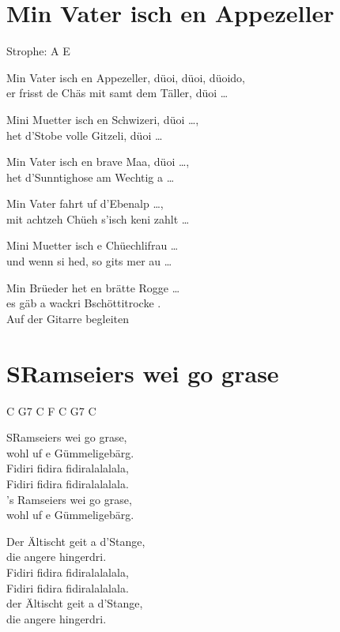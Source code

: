 \documentclass[
  letterpaper,
  twoside=false]{scrbook}
\begin{document}
\hypertarget{min-vater-isch-en-appezeller}{%
\chapter{Min Vater isch en
Appezeller}\label{min-vater-isch-en-appezeller}}

Strophe: A E

Min Vater isch en Appezeller, düoi, düoi, düoido,\\
er frisst de Chäs mit samt dem Täller, düoi \ldots{}

Mini Muetter isch en Schwizeri, düoi \ldots,\\
het d'Stobe volle Gitzeli, düoi \ldots{}

Min Vater isch en brave Maa, düoi \ldots,\\
het d'Sunntighose am Wechtig a \ldots{}

Min Vater fahrt uf d'Ebenalp \ldots,\\
mit achtzeh Chüeh s'isch keni zahlt \ldots{}

Mini Muetter isch e Chüechlifrau \ldots{}\\
und wenn si hed, so git\textquotesingle s mer au \ldots{}

Min Brüeder het en brätte Rogge \ldots{}\\
es gäb a wackri Bschöttitrocke .\\
Auf der Gitarre begleiten

\hypertarget{sramseiers-wei-go-grase}{%
\chapter{S\textquotesingle Ramseiers wei go
grase}\label{sramseiers-wei-go-grase}}

C G7 C F C G7 C

S\textquotesingle Ramseiers wei go grase,\\
wohl uf e Gümmeligebärg.\\
Fidiri fidira fidiralalalala,\\
Fidiri fidira fidiralalalala.\\
's Ramseiers wei go grase,\\
wohl uf e Gümmeligebärg.

Der Ältischt geit a d'Stange,\\
die angere hingerdri.\\
Fidiri fidira fidiralalalala,\\
Fidiri fidira fidiralalalala.\\
der Ältischt geit a d'Stange,\\
die angere hingerdri.
\end{document}
